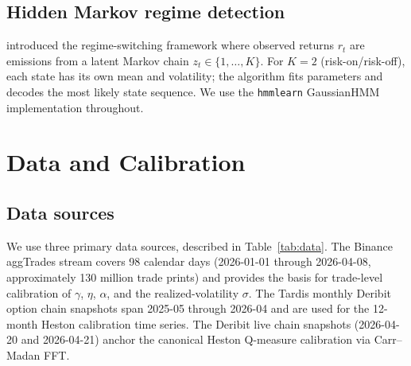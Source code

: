 \documentclass[11pt,letterpaper]{article}
\begin{document}
\subsection{Hidden Markov regime detection}

\citet{hamilton1989new} introduced the regime-switching framework where observed returns \(r_t\) are emissions from a latent Markov chain \(z_t \in \{1,\ldots,K\}\). For \(K=2\) (risk-on/risk-off), each state has its own mean and volatility; the \citet{baum1970maximization} algorithm fits parameters and \citet{viterbi1967error} decodes the most likely state sequence. We use the \texttt{hmmlearn} GaussianHMM implementation throughout.

\section{Data and Calibration}
\label{sec:data}

\subsection{Data sources}

We use three primary data sources, described in Table~\ref{tab:data}. The Binance aggTrades stream covers 98 calendar days (2026-01-01 through 2026-04-08, approximately 130 million trade prints) and provides the basis for trade-level calibration of \(\gamma\), \(\eta\), \(\alpha\), and the realized-volatility \(\sigma\). The Tardis monthly Deribit option chain snapshots span 2025-05 through 2026-04 and are used for the 12-month Heston calibration time series. The Deribit live chain snapshots (2026-04-20 and 2026-04-21) anchor the canonical Heston Q-measure calibration via Carr--Madan FFT.
\end{document}
